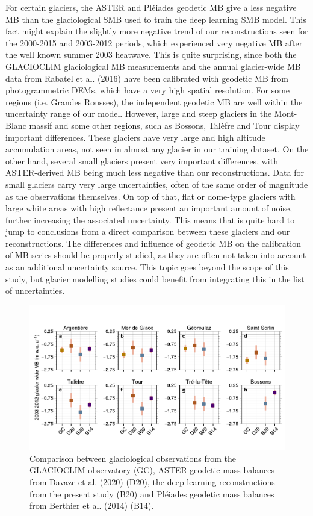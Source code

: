 {For certain glaciers, the ASTER and Pléiades geodetic MB give a less negative MB than the glaciological SMB used to train the deep learning SMB model. This fact might explain the slightly more negative trend of our reconstructions seen for the 2000-2015 and 2003-2012 periods, which experienced very negative MB after the well known summer 2003 heatwave. This is quite surprising, since both the GLACIOCLIM glaciological MB measurements and the annual glacier-wide MB data from Rabatel et al. (2016) have been calibrated with geodetic MB from photogrammetric DEMs, which have a very high spatial resolution. For some regions (i.e. Grandes Rousses), the independent geodetic MB are well within the uncertainty range of our model. However, large and steep glaciers in the Mont-Blanc massif and some other regions, such as Bossons, Talèfre and Tour display important differences. These glaciers have very large and high altitude accumulation areas, not seen in almost any glacier in our training dataset. On the other hand, several small glaciers present very important differences, with ASTER-derived MB being much less negative than our reconstructions. Data for small glaciers carry very large uncertainties, often of the same order of magnitude as the observations themselves. On top of that, flat or dome-type glaciers with large white areas with high reflectance present an important amount of noise, further increasing the associated uncertainty. This means that is quite hard to jump to conclusions from a direct comparison between these glaciers and our reconstructions. The differences and influence of geodetic MB on the calibration of MB series should be properly studied, as they are often not taken into account as an additional uncertainty source. This topic goes beyond the scope of this study, but glacier modelling studies could benefit from integrating this in the list of uncertainties. 

\begin{figure}[t]
\centering
\includegraphics[width=12cm]{Figures/past/Figure_S2.pdf}
\captionsetup{justification=centering}
\caption{Comparison between glaciological observations from the GLACIOCLIM observatory (GC), ASTER geodetic mass balances from Davaze et al. (2020) (D20), the deep learning reconstructions from the present study (B20) and Pléiades geodetic mass balances from Berthier et al. (2014) (B14).}
\label{past:figS2}
\end{figure}

}
